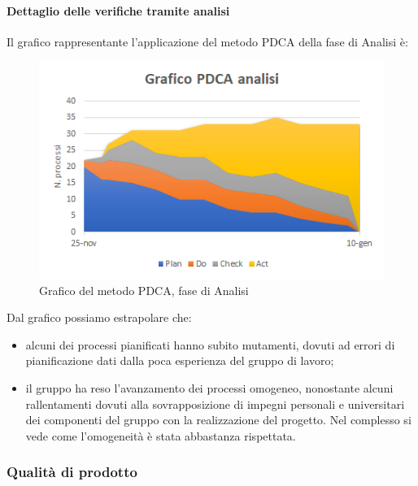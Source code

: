 \paragraph{Dettaglio delle verifiche tramite analisi} \Spazio
Il grafico rappresentante l'applicazione del metodo PDCA della fase di Analisi è:
\begin{figure} [H]
	\centering
	\includegraphics[scale=1]{Img/Grafico_PDCA}
	\caption{Grafico del metodo PDCA, fase di Analisi}\label{immagine:pdca analisi}
\end{figure}
Dal grafico possiamo estrapolare che:
\begin{itemize}
	\item alcuni dei processi pianificati hanno subito mutamenti, dovuti ad errori di pianificazione dati dalla poca esperienza del gruppo di lavoro;
	\item il gruppo ha reso l'avanzamento dei processi omogeneo, nonostante alcuni rallentamenti dovuti alla sovrapposizione di impegni personali e universitari dei componenti del gruppo con la realizzazione del progetto. Nel complesso si vede come l'omogeneità è stata abbastanza rispettata.
\end{itemize}
\subsubsection{Qualità di prodotto}
